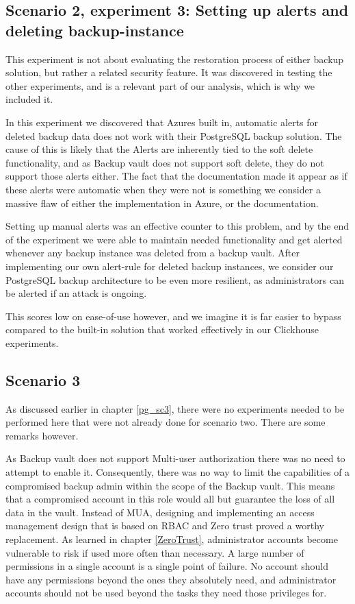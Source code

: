 \subsection{Scenario 2, experiment 3: Setting up alerts and deleting backup-instance}
This experiment is not about evaluating the restoration process of either backup solution, but rather a related security feature. It was discovered in testing the other experiments, and is a relevant part of our analysis, which is why we included it.

In this experiment we discovered that Azures built in, automatic alerts for deleted backup data does not work with their PostgreSQL backup solution. The cause of this is likely that the Alerts are inherently tied to the soft delete functionality, and as Backup vault does not support soft delete, they do not support those alerts either. The fact that the documentation made it appear as if these alerts were automatic when they were not is something we consider a massive flaw of either the implementation in Azure, or the documentation.

Setting up manual alerts was an effective counter to this problem, and by the end of the experiment we were able to maintain needed functionality and get alerted whenever any backup instance was deleted from a backup vault. After implementing our own alert-rule for deleted backup instances, we consider our PostgreSQL backup architecture to be even more resilient, as administrators can be alerted if an attack is ongoing.

This scores low on ease-of-use however, and we imagine it is far easier to bypass compared to the built-in solution that worked effectively in our Clickhouse experiments.

\subsection{Scenario 3}
As discussed earlier in chapter \ref{pg_sc3}, there were no experiments needed to be performed here that were not already done for scenario two. There are some remarks however.

As Backup vault does not support Multi-user authorization there was no need to attempt to enable it. Consequently, there was no way to limit the capabilities of a compromised backup admin within the scope of the Backup vault. This means that a compromised account in this role would all but guarantee the loss of all data in the vault. Instead of MUA, designing and implementing an access management design that is based on RBAC and Zero trust proved a worthy replacement. As learned in chapter \ref{ZeroTrust}, administrator accounts become vulnerable to risk if used more often than necessary. A large number of permissions in a single account is a single point of failure. No account should have any permissions beyond the ones they absolutely need, and administrator accounts should not be used beyond the tasks they need those privileges for.

